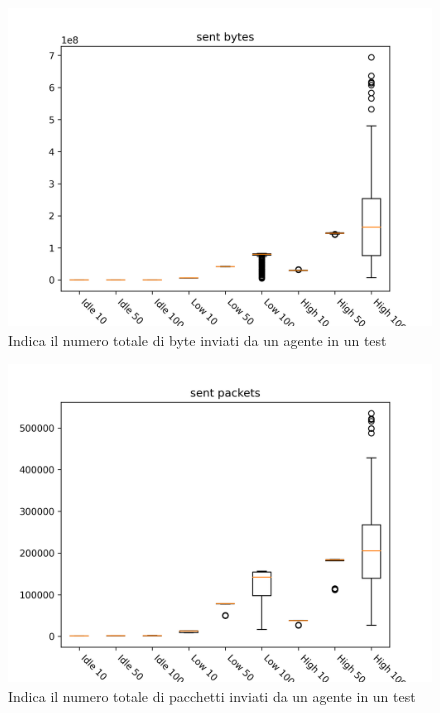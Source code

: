 \documentclass[target=bach]{thud}
\begin{document}
\begin{figure}[H]
    \includegraphics[width=\linewidth, height=0.4\textheight, keepaspectratio]{graphs/sent bytes.png}
    \caption{Indica il numero totale di byte inviati da un agente in un test}
    \label{fig:sb}
\end{figure}

\begin{figure}[H]
    \includegraphics[width=\linewidth, height=0.4\textheight, keepaspectratio]{graphs/sent packets.png}
    \caption{Indica il numero totale di pacchetti inviati da un agente in un test}
    \label{fig:sp}
\end{figure}
\end{document}
